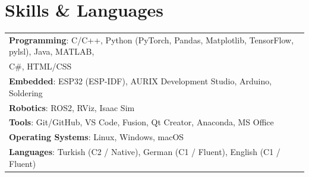 \documentclass[a4paper,11pt]{article}
\begin{document}
\section{Skills \& Languages}
\small
\begin{tabular*}{\textwidth}{@{\extracolsep{\fill}} l}
\textbf{Programming}: C/C++, Python (PyTorch, Pandas, Matplotlib, TensorFlow, pylsl), Java, MATLAB,\\ C\#, HTML/CSS \\
\vspace{0.1cm}
\textbf{Embedded}: ESP32 (ESP-IDF), AURIX Development Studio, Arduino, Soldering \\
\vspace{0.1cm}
\textbf{Robotics}: ROS2, RViz, Isaac Sim \\
\vspace{0.1cm}
\textbf{Tools}: Git/GitHub, VS Code, Fusion, Qt Creator, Anaconda, MS Office \\
\vspace{0.1cm}
\textbf{Operating Systems}: Linux, Windows, macOS \\
\vspace{0.1cm}
\textbf{Languages}: Turkish (C2 / Native), German (C1 / Fluent), English (C1 / Fluent)
\end{tabular*}
\end{document}
